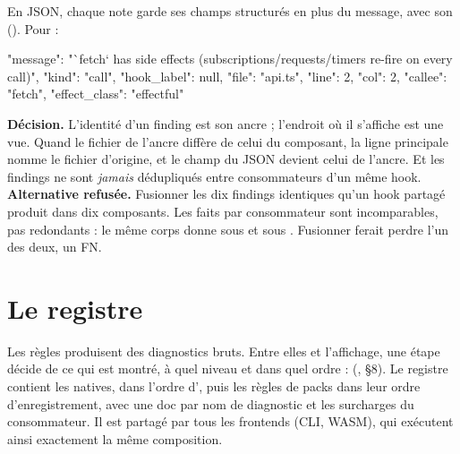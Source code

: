 
En JSON, chaque note garde ses champs structurés en plus du message, avec son  (). Pour  :

\begin{sortie}
        {
          "message": "`fetch` has side effects (subscriptions/requests/timers re-fire on every call)",
          "kind": "call",
          "hook_label": null,
          "file": "api.ts",
          "line": 2,
          "col": 2,
          "callee": "fetch",
          "effect_class": "effectful"
        }
\end{sortie}

\begin{decision}
\textbf{Décision.} L'identité d'un finding est son ancre  ; l'endroit où il s'affiche est une vue. Quand le fichier de l'ancre diffère de celui du composant, la ligne principale nomme le fichier d'origine, et le champ  du JSON devient celui de l'ancre. Et les findings ne sont \emph{jamais} dédupliqués entre consommateurs d'un même hook.
\textbf{Alternative refusée.} Fusionner les dix findings identiques qu'un hook partagé produit dans dix composants. Les faits par consommateur sont incomparables, pas redondants : le même corps donne  sous  et  sous . Fusionner ferait perdre l'un des deux, un FN.
\end{decision}

\section{Le registre}
\label{sec:api-regles-registre}

Les règles produisent des diagnostics bruts. Entre elles et l'affichage, une étape décide de ce qui est montré, à quel niveau et dans quel ordre :  (,  §8). Le registre contient les natives, dans l'ordre d', puis les règles de packs dans leur ordre d'enregistrement, avec une doc par nom de diagnostic et les surcharges du consommateur. Il est partagé par tous les frontends (CLI, WASM), qui exécutent ainsi exactement la même composition.


